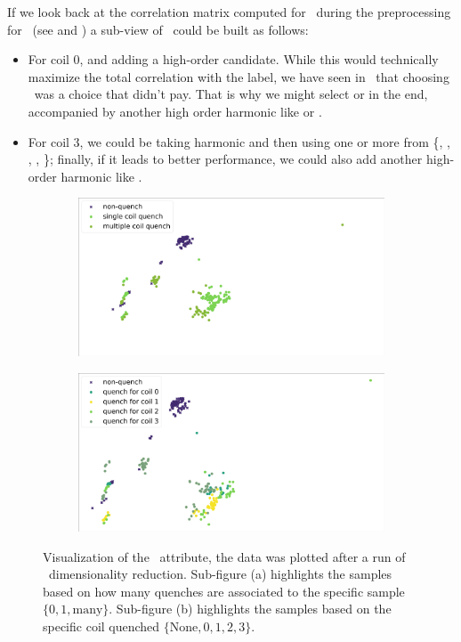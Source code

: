 If we look back at the correlation matrix computed for \cnmod\ during the preprocessing for \qrp\
(see  and ) a sub-view of \cnmod\ could be built as follows:
\begin{itemize}
	\item For coil $0$, \cnmod[2] and adding a high-order candidate. While this would
		technically maximize the total correlation with the label, we have seen in \qrp\
		that choosing \cnmod[2]\ was a choice that didn't pay. That is why we might select
		\cnmod[3] or \cnmod[6] in the end, accompanied by another high order harmonic like
		\cnmod[9] or \cnmod[11].
	\item For coil $3$, we could be taking harmonic \cnmod[1] and then using one or more from
	      \{\cnmod[4], \cnmod[5], \cnmod[6], \cnmod[7], \cnmod[8]\}; finally, if it leads to
	      better performance, we could also add another high-order harmonic like \cnmod[10].
\end{itemize}
\begin{figure}[!ht]
	\centering
	\begin{subfigure}{0.6\linewidth}
		\centering
		\includegraphics[width=\linewidth]{img/quench_dist_qlp/single_vs_multiple_Cnmod.png}
		\subcaption{}
	\end{subfigure}
	\begin{subfigure}{0.6\linewidth}
		\centering
		\includegraphics[width=\linewidth]{img/quench_dist_qlp_cnmod.png}
		\subcaption{}
	\end{subfigure}
	\caption{Visualization of the \cnmod\ attribute, the data was plotted after a run of \pca\
		dimensionality reduction. Sub-figure (a) highlights the samples based on how many quenches
		are associated to the specific sample $\{0, 1, \text{many}\}$. Sub-figure (b) highlights the
		samples based on the specific coil quenched $\{\text{None}, 0, 1, 2, 3\}$.}
	\label{fig:cnmod-coilq-dist}
\end{figure}
